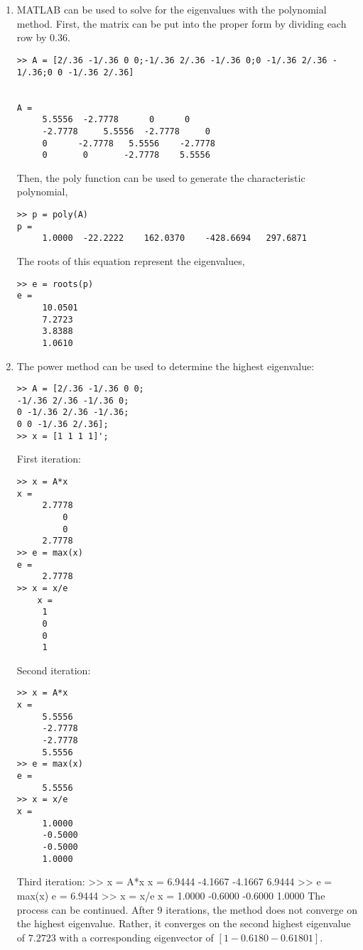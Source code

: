 \documentclass[../main.tex]{subfiles}
\begin{document}
\section{}
\begin{enumerate}[label=\bfseries(\alph*)]
\item MATLAB can be used to solve for the eigenvalues with the polynomial method. First, the matrix can be put into the proper form by dividing each row by $0.36$.
	\bigbreak
\begin{lstlisting}[numbers=none]
>> A = [2/.36 -1/.36 0 0;-1/.36 2/.36 -1/.36 0;0 -1/.36 2/.36 -
1/.36;0 0 -1/.36 2/.36]


A =
	 5.5556	 -2.7778	  0	 	 0
	 -2.7778	 5.5556	 -2.7778	 0
	 0 		-2.7778	  5.5556	-2.7778
	 0		 0	 	 -2.7778 	5.5556 
\end{lstlisting}
	\bigbreak
Then, the poly function can be used to generate the characteristic polynomial,
	\bigbreak
\begin{lstlisting}[numbers=none]
>> p = poly(A)
p =
	 1.0000	 -22.2222	 162.0370	 -428.6694	 297.6871
\end{lstlisting}
	\bigbreak
The roots of this equation represent the eigenvalues,
	\bigbreak
\begin{lstlisting}[numbers=none]
>> e = roots(p)
e =
	 10.0501
	 7.2723
	 3.8388
	 1.0610
\end{lstlisting}
	\bigbreak
\item The power method can be used to determine the highest eigenvalue:
	\bigbreak
\begin{lstlisting}[numbers=none]
>> A = [2/.36 -1/.36 0 0;
-1/.36 2/.36 -1/.36 0;
0 -1/.36 2/.36 -1/.36;
0 0 -1/.36 2/.36];
>> x = [1 1 1 1]'; 
\end{lstlisting}
	\bigbreak
First iteration:
	\bigbreak
\begin{lstlisting}[numbers=none]
>> x = A*x
x = 
	 2.7778
		 0
		 0
	 2.7778
>> e = max(x)
e =
	 2.7778
>> x = x/e
	x =
	 1
	 0
	 0
	 1
\end{lstlisting}
	\bigbreak
Second iteration:
	\bigbreak
\begin{lstlisting}[numbers=none]
>> x = A*x
x =
	 5.5556
	 -2.7778
	 -2.7778
	 5.5556
>> e = max(x)
e =
	 5.5556
>> x = x/e
x =
	 1.0000
	 -0.5000
	 -0.5000
	 1.0000 
\end{lstlisting}
	\bigbreak
Third iteration:
	\bigbreak
>> x = A*x
x =
	 6.9444
	 -4.1667
	 -4.1667
	 6.9444
>> e = max(x)
e =
	 6.9444
>> x = x/e
x =
	 1.0000
	 -0.6000
	 -0.6000
	 1.0000
	\bigbreak
The process can be continued. After 9 iterations, the method does not converge on the highest eigenvalue. Rather, it converges on the second highest eigenvalue of $7.2723$ with a corresponding eigenvector of $[1-0.6180-0.61801]$.

\end{enumerate}
\end{document}
